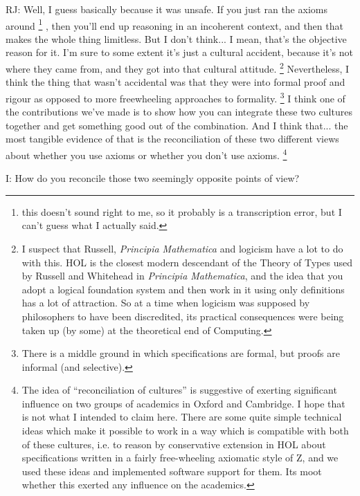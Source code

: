 \documentclass[10pt,titlepage]{book}
\begin{document}
RJ: Well, I guess basically because it was unsafe.
If you just ran the axioms around%
\footnote{this doesn't sound right to me, so it probably is a transcription error, but I can't guess what I actually said.}%
, then you'll end up reasoning in an incoherent context, and then that makes the whole thing limitless.
But I don't think... I mean, that's the objective reason for it.
I'm sure to some extent it's just a cultural accident, because it's not where they came from, and they got into that cultural attitude.%
\footnote{
I suspect that Russell, {\it Principia Mathematica} and logicism have a lot to do with this.
HOL is the closest modern descendant of the Theory of Types used by Russell and Whitehead in {\it Principia Mathematica}, and the idea that you adopt a logical foundation system and then work in it using only definitions has a lot of attraction.
So at a time when logicism was supposed by philosophers to have been discredited, its practical consequences were being taken up (by some) at the theoretical end of Computing.}%
Nevertheless, I think the thing that wasn't accidental was that they were into formal proof and rigour as opposed to more freewheeling approaches to formality.%
\footnote{
There is a middle ground in which specifications are formal, but proofs are informal (and selective).
}%
I think one of the contributions we've made is to show how you can integrate these two cultures together and get something good out of the combination.
And I think that... the most tangible evidence of that is the reconciliation of these two different views about whether you use axioms or whether you don't use axioms.
\footnote{The idea of ``reconciliation of cultures'' is suggestive of exerting significant influence on two groups of academics in Oxford and Cambridge.
I hope that is not what I intended to claim here.
There are some quite simple technical ideas which make it possible to work in a way which is compatible with both of these cultures, i.e. to reason by conservative extension in HOL about specifications written in a fairly free-wheeling axiomatic style of Z, and we used these ideas and implemented software support for them.
Its moot whether this exerted any influence on the academics.}

I: How do you reconcile those two seemingly opposite points of view?
\end{document}
